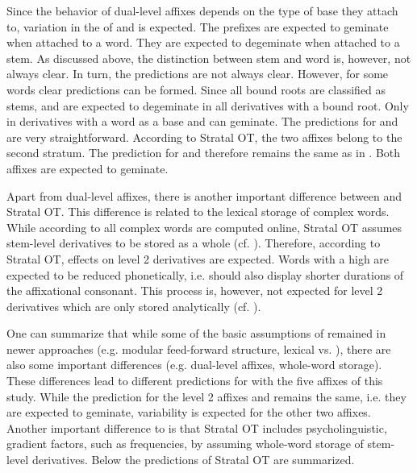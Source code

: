 Since the behavior of dual-level affixes depends on the type of base they attach to, variation in the  of  and  is expected. The prefixes are expected to geminate when attached to a word. They are expected to degeminate when attached to a stem. As discussed above, the distinction between stem and word is, however, not always clear. In turn, the predictions are not always clear. However, for some words clear predictions can be formed. Since all bound roots are classified as stems,  and  are expected to degeminate in all derivatives with a bound root. Only in derivatives with a word as a base  and  can geminate.
The predictions for  and  are very straightforward. According to Stratal OT, the two affixes belong to the second stratum. The prediction for  and  therefore remains the same as in . Both affixes are expected to geminate.



Apart from dual-level affixes, there is another important difference between  and Stratal OT.  This difference is related to the {lexical storage} of complex words. While according to  all complex words are computed online, Stratal OT assumes stem-level derivatives to be stored as a whole (cf. \citealt[chapter 3]{BermudezOtero.2012}). Therefore, according to Stratal OT,  effects on level 2 derivatives are expected.  Words with a high  are expected to be reduced phonetically, i.e. should also display shorter durations of the affixational consonant. This  process is, however, not expected for level 2 derivatives which are only stored analytically (cf. \citealt[chapter 3.3]{BermudezOtero.2012}). 



One can summarize that while some of the basic assumptions of  remained in newer approaches (e.g. modular feed-forward structure, lexical vs. ), there are also some important differences (e.g. dual-level affixes, {whole-word storage}). These differences lead to different predictions for  with the five affixes of this study. While the prediction for the level 2 affixes  and  remains the same, i.e. they are expected to geminate, variability is expected for the other two affixes. Another important difference to  is that Stratal OT includes psycholinguistic, gradient factors, such as frequencies, by assuming {whole-word storage} of stem-level derivatives. Below the predictions of Stratal OT are summarized.


